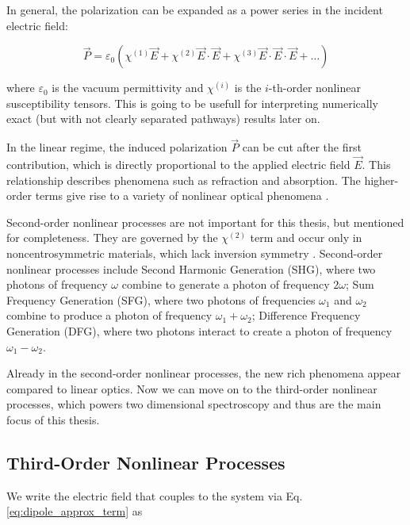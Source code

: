 In general, the polarization can be expanded as a power series in the incident electric field:

\begin{equation}
	\vec{P} = \varepsilon_0 (\chi^{(1)} \vec{E} + \chi^{(2)} \vec{E} \cdot \vec{E} + \chi^{(3)} \vec{E} \cdot \vec{E} \cdot \vec{E} + \ldots)
	\label{eq:nonlinear_polarization}
\end{equation}

\noindent 
where $\varepsilon_0$ is the vacuum permittivity and $\chi^{(i)}$ is the $i$-th-order nonlinear susceptibility tensors.  This is going to be usefull for interpreting numerically exact (but with not clearly separated pathways) results later on.

\noindent 
In the linear regime, the induced polarization $\vec{P}$ can be cut after the first contribution, which is directly proportional to the applied electric field $\vec{E}$.
This relationship describes phenomena such as refraction and absorption.
The higher-order terms give rise to a variety of nonlinear optical phenomena \cite{boyd2008contents}.

\noindent 
{}
Second-order nonlinear processes are not important for this thesis, but mentioned for completeness.
They are governed by the $\chi^{(2)}$ term and occur only in noncentrosymmetric materials, which lack inversion symmetry \cite{rao2018overviewsecondthird,boyd2008chapter1nonlinear}.  Second-order nonlinear processes include Second Harmonic Generation (SHG), where two photons of frequency $\omega$ combine to generate a photon of frequency $2\omega$; Sum Frequency Generation (SFG), where two photons of frequencies $\omega_1$ and $\omega_2$ combine to produce a photon of frequency $\omega_1 + \omega_2$; Difference Frequency Generation (DFG), where two photons interact to create a photon of frequency $\omega_1 - \omega_2$.

\noindent
Already in the second-order nonlinear processes, the new rich phenomena appear compared to linear optics.
Now we can move on to the third-order nonlinear processes, which powers two dimensional spectroscopy and thus are the main focus of this thesis.



\subsection{Third-Order Nonlinear Processes}
\label{subsec:third_order}
\noindent
We write the electric field that couples to the system via Eq. \eqref{eq:dipole_approx_term} as 

